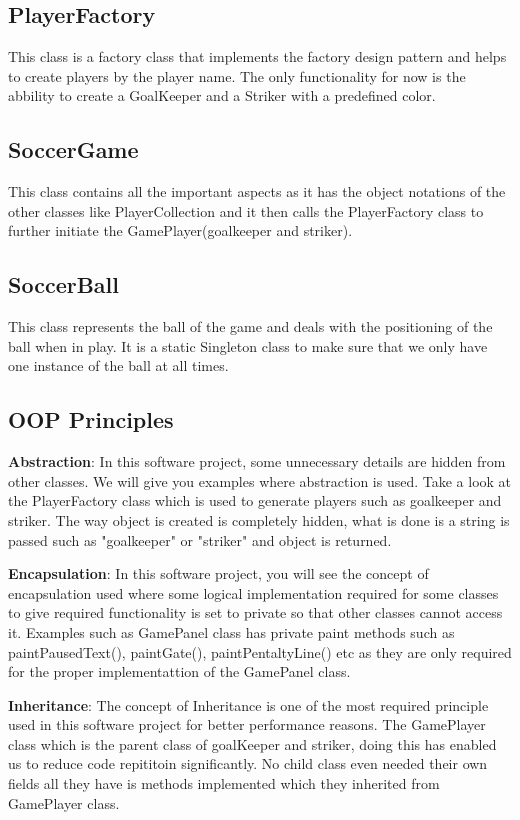 \documentclass[12pt, dvipsnames, a4paper]{article}
\begin{document}
\subsection{PlayerFactory}
This class is a factory class that implements the factory design pattern and helps to create players by
the player name. The only functionality for now is the abbility to create a GoalKeeper and a Striker
with a predefined color.
\subsection{SoccerGame}
This class contains all the important aspects as it has the object notations of the other classes like PlayerCollection and it then
calls the PlayerFactory class to further initiate the GamePlayer(goalkeeper and striker).
\subsection{SoccerBall}
This class represents the ball of the game and deals with the positioning of the ball when in play. It is a static Singleton
class to make sure that we only have one instance of the ball at all times.

\clearpage

\subsection{OOP Principles}
\textbf{Abstraction}: In this software project, some unnecessary details are hidden from other classes. We will give you examples
where abstraction is used. Take a look at the PlayerFactory class which is used to generate players such as goalkeeper
and striker. The way object is created is completely hidden, what is done is a string is passed such as "goalkeeper" or
"striker" and object is returned.

\textbf{Encapsulation}: In this software project, you will see the concept of encapsulation used where some logical implementation
required for some classes to give required functionality is set to private so that other classes cannot access it.
Examples such as GamePanel class has private paint methods such as paintPausedText(), paintGate(), paintPentaltyLine() etc
as they are only required for the proper implementattion of the GamePanel class.

\textbf{Inheritance}: The concept of Inheritance is one of the most required principle used in this software project for better performance reasons.
The GamePlayer class which is the parent class of goalKeeper and striker, doing this has enabled us to reduce code repititoin significantly.
No child class even needed their own fields all they have is methods implemented which they inherited from GamePlayer class.
\end{document}
